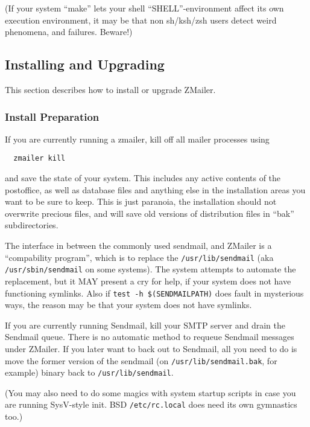 (If your system ``make'' lets your shell ``SHELL''-environment
affect its own execution environment, it may be that non sh/ksh/zsh
users detect weird phenomena, and failures. Beware!)


\subsection{Installing and Upgrading}

This section describes how to install or upgrade ZMailer.


\subsubsection{Install Preparation}%
%

If you are currently running a zmailer, kill off all mailer processes
using
\begin{verbatim}
  zmailer kill
\end{verbatim}

and save the state of your system.  This includes any active
contents of the postoffice, as well as database files and
anything else in the installation areas you want to be sure
to keep.  This is just paranoia, the installation should not
overwrite precious files, and will save old versions of
distribution files in ``bak'' subdirectories.

The interface in between the commonly used sendmail, and ZMailer
is a ``compability program'', which is to replace the {\tt /usr/lib/sendmail}
(aka {\tt /usr/sbin/sendmail} on some systems).
The system attempts to automate the replacement, but it MAY present
a cry for help, if your system does not have functioning symlinks.
Also if {\tt test -h \$(SENDMAILPATH)} does fault in mysterious ways,
the reason may be that your system does not have symlinks.

If you are currently running Sendmail, kill your SMTP server
and drain the Sendmail queue.  There is no automatic method
to requeue Sendmail messages under ZMailer.  If you later want
to back out to Sendmail, all you need to do is move the former
version of the sendmail (on {\tt /usr/lib/sendmail.bak}, for example)
binary back to {\tt /usr/lib/sendmail}.

(You may also need to do some magics with system startup scripts
in case you are running SysV-style init. BSD {\tt /etc/rc.local}
does need its own gymnastics too.)

